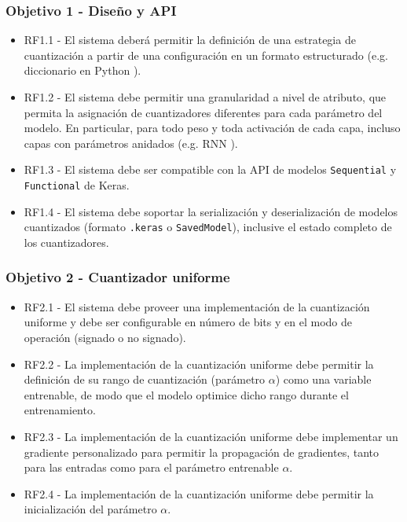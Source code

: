\subsubsection*{Objetivo 1 - Diseño y API}

\begin{itemize}
    \item RF1.1 - El sistema deberá permitir la definición de una estrategia de cuantización a partir de una configuración en un formato estructurado (e.g. diccionario en Python \cite{python_dictionaries}).

    \item RF1.2 - El sistema debe permitir una granularidad a nivel de atributo, que permita la asignación de cuantizadores diferentes para cada parámetro del modelo. En particular, para todo peso y toda activación de cada capa, incluso capas con parámetros anidados (e.g. RNN \cite{tensorflow_keras_rnn}).

    \item RF1.3 - El sistema debe ser compatible con la API de modelos \texttt{Sequential} \cite{tensorflow_keras_sequential_api} y \texttt{Functional} \cite{tensorflow_keras_functional_api} de Keras.

    \item RF1.4 - El sistema debe soportar la serialización y deserialización \cite{tensorflow_serialization_guide} de modelos cuantizados (formato \texttt{.keras} o \texttt{SavedModel}), inclusive el estado completo de los cuantizadores.
\end{itemize}

\subsubsection*{Objetivo 2 - Cuantizador uniforme}

\begin{itemize}
    \item RF2.1 - El sistema debe proveer una implementación de la cuantización uniforme y debe ser configurable en número de bits y en el modo de operación (signado o no signado).

    \item RF2.2 - La implementación de la cuantización uniforme debe permitir la definición de su rango de cuantización (parámetro $\alpha$) como una variable entrenable, de modo que el modelo optimice dicho rango durante el entrenamiento.

    \item RF2.3 - La implementación de la cuantización uniforme debe implementar un gradiente personalizado para permitir la propagación de gradientes, tanto para las entradas como para el parámetro entrenable $\alpha$.

    \item RF2.4 - La implementación de la cuantización uniforme debe permitir la inicialización del parámetro $\alpha$.
\end{itemize}

